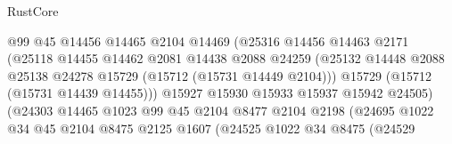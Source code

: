 \begin{lexlean}{RustCore}
\begin{coremodule}
                                      @99
                                      @45
                                      @14456
                                      @14465
                                      @2104
                                      @14469
                                      (@25316
                                        @14456
                                        @14463
                                        @2171
                                        (@25118
                                          @14455
                                          @14462
                                          @2081
                                          @14438
                                          @2088
                                          @24259
                                          (@25132
                                            @14448
                                            @2088
                                            @25138
                                            @24278
                                            @15729
                                            (@15712 (@15731 @14449 @2104)))
                                          @15729
                                          (@15712 (@15731 @14439 @14455)))
                                        @15927
                                        @15930
                                        @15933
                                        @15937
                                        @15942
                                        @24505)
                                      (@24303
                                        @14465
                                        @1023
                                        @99
                                        @45
                                        @2104
                                        @8477
                                        @2104
                                        @2198
                                        (@24695
                                          @1022
                                          @34
                                          @45
                                          @2104
                                          @8475
                                          @2125
                                          @1607
                                          (@24525
                                            @1022
                                            @34
                                            @8475
                                            (@24529

\end{coremodule}
\end{lexlean}
